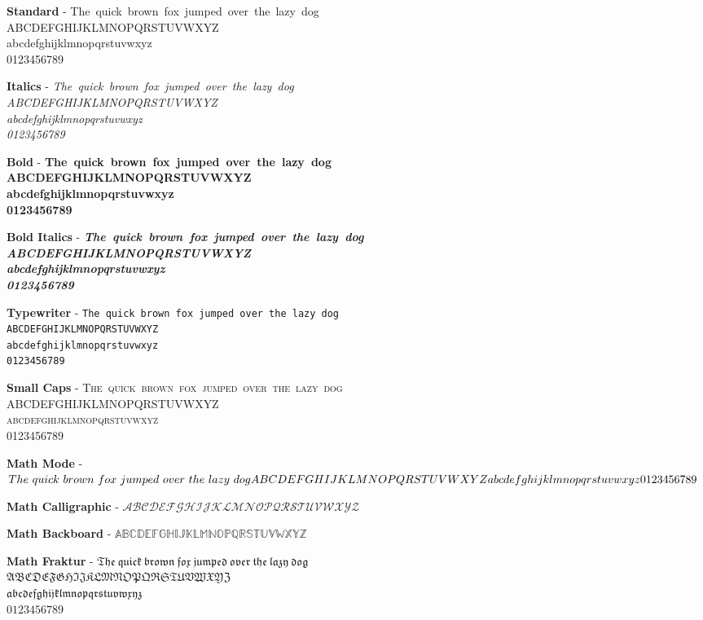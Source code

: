 
\usepackage{enumitem}

\usepackage{layout}
\usepackage{lipsum}

\newcommand{\Rsamplefox}{The~quick~brown~fox~jumped~over~the~lazy~dog}
\newcommand{\Rsampleupp}{ABCDEFGHIJKLMNOPQRSTUVWXYZ}
\newcommand{\Rsamplelow}{abcdefghijklmnopqrstuvwxyz}
\newcommand{\Rsamplenum}{0123456789}
\newcommand{\Rsampleall}{\Rsamplefox\\\Rsampleupp\\\Rsamplelow\\\Rsamplenum}

\newwrite\tempfile





\layout

\setcounter{Rvolume}{1}
\renewcommand{\Rcurrentchapter}{The Testing Ground}

\textbf{Standard} - \Rsampleall

\textbf{Italics} - \textit{\Rsampleall}

\textbf{Bold} - \textbf{\Rsampleall}

\textbf{Bold Italics} - \textbf{\textit{\Rsampleall}}

\textbf{Typewriter} - \texttt{\Rsampleall}

\textbf{Small Caps} - \textsc{\Rsampleall}

\textbf{Math Mode} - $\Rsampleall$

\textbf{Math Calligraphic} - $\mathcal{\Rsampleupp}$

\textbf{Math Backboard} - $\mathbb{\Rsampleupp}$

\textbf{Math Fraktur} - $\mathfrak{\Rsamplefox}$\\$\mathfrak{\Rsampleupp}$\\%
$\mathfrak{\Rsamplelow}$\\$\mathfrak{\Rsamplenum}$


\newpage

